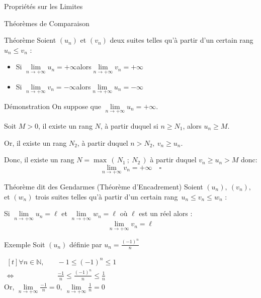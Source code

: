\documentclass{cours}
\begin{document}
    \begin{Gpartie}{Propriétés sur les Limites} 
        \begin{Spartie}{Théorèmes de Comparaison} 
            \begin{SSpartie}{Théorème} 
                Soient $(u_n)$ et $(v_n)$ deux suites telles qu'à partir d'un certain rang $u_n\leq v_n$ :
                \begin{itemize}
                    \setlength\itemsep{0.5em}
                    \item Si $\lim\limits_{n\to +\infty}u_n=+\infty$\quad alors\quad $\lim\limits_{n\to +\infty}v_n=+\infty$
                    \item Si $\lim\limits_{n\to +\infty}v_n=-\infty$\quad alors\quad $\lim\limits_{n\to +\infty}u_n=-\infty$
                \end{itemize}
            \end{SSpartie}
            \begin{SSpartie}{Démonstration} 
                On suppose que $\lim\limits_{n\to +\infty}u_n=+\infty$.

                Soit $M>0$, il existe un rang $N$, à partir duquel si $n\geq N_1$, alors $u_n\geq M$.

                Or, il existe un rang $N_2$, à partir duquel $n>N_2,\ v_n\geq u_n$.

                Donc, il existe un rang $N=\max\,(\,N_1~;~N_2\,)$ à partir duquel $v_n\geq u_n>M$ donc: \[\lim\limits_{n\to +\infty}v_n=+\infty\quad\square\]
            \end{SSpartie}
            \begin{SSpartie}{Théorème dit \og des Gendarmes \fg{} (Théorème d'Encadrement)}
                Soient $(u_n),\ (v_n),$ et $(w_n)$ trois suites telles qu'à partir d'un certain rang~$u_n\leq v_n\leq w_n$ :

                Si $\lim\limits_{n\to +\infty}u_n=\ell$ et $\lim\limits_{n\to +\infty}w_n=\ell$ où $\ell$ est un réel alors :
                \[\lim\limits_{n\to +\infty}v_n=\ell\]
            \end{SSpartie}
            \begin{SSpartie}{Exemple} 
                Soit $(u_n)$ définie par $u_n=\frac{(-1)^n}{n}$

                $\begin{aligned}[t]
                    \forall n\in\mathbb{N},&\quad-1\leq (-1)^n\leq 1 \\
                    \iff&\quad\frac{-1}{n}\leq\frac{(-1)^n}{n}\leq\frac{1}{n}
                \end{aligned}$ \\[2ex]
                Or, $\lim\limits_{n\to +\infty}\frac{-1}{n}=0,\ \lim\limits_{n\to +\infty}\frac{1}{n}=0$


\end{SSpartie}
\end{Spartie}
\end{Gpartie}
\end{document}
